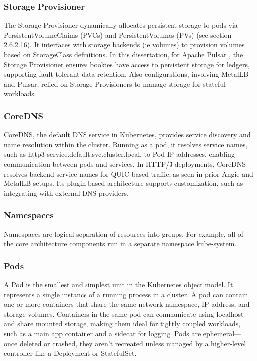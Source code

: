 \subsubsection{Storage Provisioner}
The Storage Provisioner dynamically allocates persistent storage to pods via PersistentVolumeClaims (PVCs) and PersistentVolumes (PVs) (see section 2.6.2.16). It interfaces with storage backends (ie volumes) to provision volumes based on StorageClass definitions. In this dissertation, for Apache Pulsar \cite{pulsar-helm-repo}, the Storage Provisioner ensures bookies have access to persistent storage for ledgers, supporting fault-tolerant data retention. Also configurations, involving MetalLB and Pulsar, relied on Storage Provisioners to manage storage for stateful workloads.

\subsubsection{CoreDNS}
CoreDNS, the default DNS service in Kubernetes, provides service discovery and name resolution within the cluster. Running as a pod, it resolves service names, such as http3-service.default.svc.cluster.local, to Pod IP addresses, enabling communication between pods and services. In HTTP/3 deployments, CoreDNS resolves backend service names for QUIC-based traffic, as seen in prior Angie and MetalLB setups. Its plugin-based architecture supports customization, such as integrating with external DNS providers.

\subsubsection{Namespaces}
Namespaces are logical separation of resources into groups. For example, all of the core architecture components run in a separate namespace kube-system.

\subsubsection{Pods}
A Pod is the smallest and simplest unit in the Kubernetes object model. It represents a single instance of a running process in a cluster. A pod can contain one or more containers that share the same network namespace, IP address, and storage volumes. Containers in the same pod can communicate using localhost and share mounted storage, making them ideal for tightly coupled workloads, such as a main app container and a sidecar for logging. Pods are ephemeral—once deleted or crashed, they aren't recreated unless managed by a higher-level controller like a Deployment or StatefulSet.


